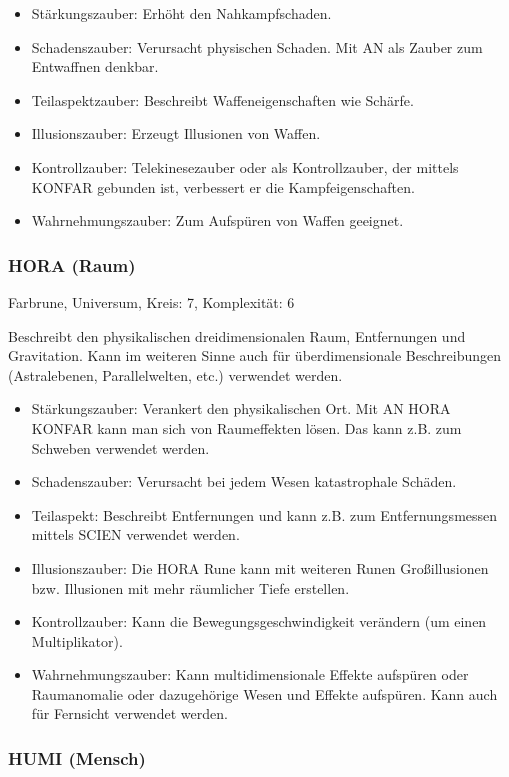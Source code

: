 \documentclass{article}
\begin{document}
\begin{itemize}
\item Stärkungszauber: Erhöht den Nahkampfschaden.
\item Schadenszauber: Verursacht physischen Schaden. Mit AN als Zauber zum Entwaffnen denkbar.
\item Teilaspektzauber: Beschreibt Waffeneigenschaften wie Schärfe.
\item Illusionszauber: Erzeugt Illusionen von Waffen.
\item Kontrollzauber: Telekinesezauber oder als Kontrollzauber, der mittels KONFAR gebunden ist, verbessert er die Kampfeigenschaften.
\item Wahrnehmungszauber: Zum Aufspüren von Waffen geeignet.
\end{itemize}


\subsubsection{HORA (Raum)}

Farbrune, Universum, Kreis: 7, Komplexität: 6

Beschreibt den physikalischen dreidimensionalen Raum, Entfernungen und Gravitation. Kann im weiteren Sinne auch für
überdimensionale Beschreibungen (Astralebenen, Parallelwelten, etc.) verwendet werden.

\begin{itemize}
\item Stärkungszauber: Verankert den physikalischen Ort. Mit AN HORA KONFAR kann man sich von Raumeffekten lösen. Das kann z.B. zum Schweben verwendet werden.
\item Schadenszauber: Verursacht bei jedem Wesen katastrophale Schäden.
\item Teilaspekt: Beschreibt Entfernungen und kann z.B. zum Entfernungsmessen mittels SCIEN verwendet werden.
\item Illusionszauber: Die HORA Rune kann mit weiteren Runen Großillusionen bzw. Illusionen mit mehr räumlicher Tiefe erstellen.
\item Kontrollzauber: Kann die Bewegungsgeschwindigkeit verändern (um einen Multiplikator).
\item Wahrnehmungszauber: Kann multidimensionale Effekte aufspüren oder Raumanomalie oder dazugehörige Wesen und Effekte aufspüren. Kann auch für Fernsicht verwendet werden.
\end{itemize}

\subsubsection{HUMI (Mensch)}
\end{document}
